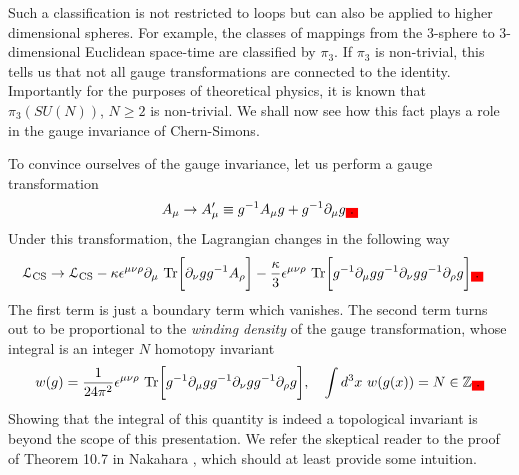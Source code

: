     Such a classification is not restricted to loops but can also be applied to higher dimensional spheres. For example, the classes of mappings from the 3-sphere to 3-dimensional Euclidean space-time are classified by $\pi_3$. If $\pi_3$ is non-trivial, this tells us that not all gauge transformations are connected to the identity. Importantly for the purposes of theoretical physics, it is known that $\pi_3\left(SU(N) \right)$, $N\geq2$ is non-trivial. We shall now see how this fact plays a role in the gauge invariance of Chern-Simons.

    To convince ourselves of the gauge invariance, let us perform a gauge transformation
    \begin{align}
        A_{\mu} \rightarrow A'_{\mu} \equiv g^{-1} A_{\mu} g + g^{-1}\partial_{\mu} g\colorbox{red}{.}
    \end{align}
    Under this transformation, the Lagrangian changes in the following way
    \begin{align}
        \mathcal{L}_{\text{CS}} &\rightarrow \mathcal{L}_{\text{CS}}  - \kappa \epsilon^{\mu \nu \rho} \partial_{\mu} \ \mathrm{Tr} \bigg[\partial_{\nu} g g^{-1} A_{\rho}  \bigg] - \frac{\kappa}{3} \epsilon^{\mu \nu \rho} \ \mathrm{Tr} \bigg[g^{-1} \partial_{\mu} g g^{-1} \partial_{\nu} g g^{-1} \partial_{\rho} g\bigg]\colorbox{red}{.}
    \end{align}
    The first term is just a boundary term which vanishes. The second term turns out to be proportional to the \textit{winding density} of the gauge transformation, whose integral is an integer $N$ homotopy invariant\colorbox{red}{ }
    \begin{align}
        w(g) = \frac{1}{24 \pi^2} \epsilon^{\mu \nu \rho} \ \mathrm{Tr} \bigg[g^{-1}\partial_{\mu} g g^{-1} \partial_{\nu} g g^{-1} \partial_{\rho} g \bigg], \quad \int d^3x \ w(g(x)) = N \in \mathbb{Z}\colorbox{red}{.}
    \end{align}
    Showing that the integral of this quantity is indeed a topological invariant is beyond the scope of this presentation. We refer the skeptical reader to the proof of Theorem 10.7 in Nakahara \cite{Nakahara}, which should at least provide some intuition.

